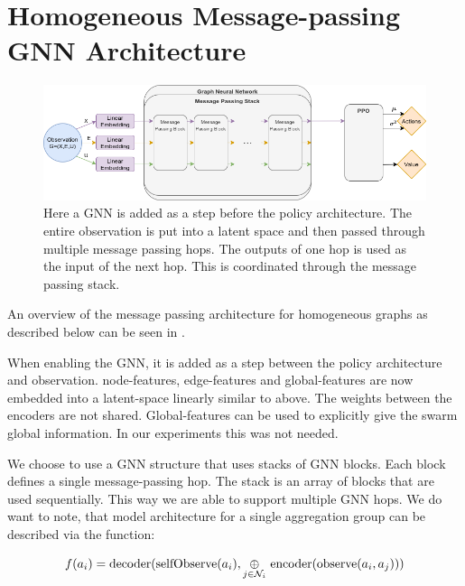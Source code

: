 \section{Homogeneous Message-passing GNN Architecture}
\begin{figure}[htp]
    \centering
    \includegraphics[width=1.0\textwidth]{figures/homogeneous_gnn.png}
    \hspace{1cm}   
    \caption{Here a GNN is added as a step before the policy architecture. The entire observation is put into a latent space and then passed through multiple message passing hops. The outputs of one hop is used as the input of the next hop. This is coordinated through the message passing stack.}
    \label{fig:homogeneous_gnn}
\end{figure}

An overview of the message passing architecture for homogeneous graphs as described below can be seen in .

When enabling the GNN, it is added as a step between the policy architecture and observation. node-features, edge-features and global-features are now embedded into a latent-space linearly similar to above. The weights between the encoders are not shared. Global-features can be used to explicitly give the swarm global information. In our experiments this was not needed. \par

We choose to use a GNN structure that uses stacks of GNN blocks. Each block defines a single message-passing hop. The stack is an array of blocks that are used sequentially. This way we are able to support multiple GNN hops. We do want to note, that  model architecture for a single aggregation group can be described via the function:

\begin{equation}
    f(a_i) = \textup{decoder(selfObserve}(a_i), \underset{j \in \mathcal{N}_i}{\oplus}\ \textup{encoder}(\textup{observe}(a_i, a_j))) \nonumber
\end{equation}


